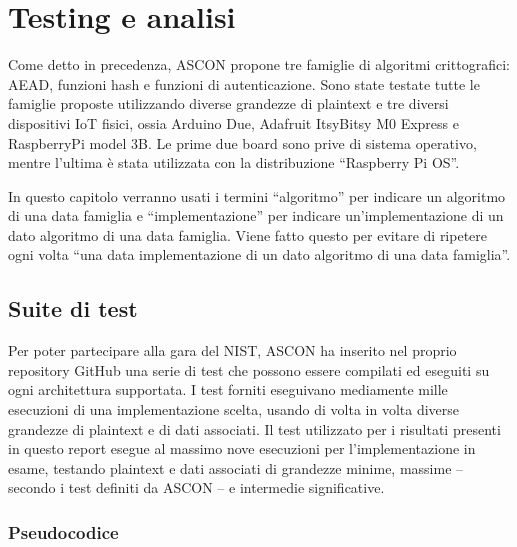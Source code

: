\chapter{Testing e analisi}

Come detto in precedenza, ASCON propone tre famiglie di algoritmi crittografici: AEAD, funzioni hash e funzioni di autenticazione. Sono state testate tutte le famiglie proposte utilizzando diverse grandezze di plaintext e tre diversi dispositivi IoT fisici, ossia Arduino Due, Adafruit ItsyBitsy M0 Express e RaspberryPi model 3B. Le prime due board sono prive di sistema operativo, mentre l'ultima è stata utilizzata con la distribuzione ``Raspberry Pi OS''. \

\noindent In questo capitolo verranno usati i termini ``algoritmo'' per indicare un algoritmo di una data famiglia e ``implementazione'' per indicare un'implementazione di un dato algoritmo di una data famiglia. Viene fatto questo per evitare di ripetere ogni volta ``una data implementazione di un dato algoritmo di una data famiglia''.

\section{Suite di test}

Per poter partecipare alla gara del NIST, ASCON ha inserito nel proprio repository GitHub una serie di test che possono essere compilati ed eseguiti su ogni architettura supportata. I test forniti eseguivano mediamente mille esecuzioni di una implementazione scelta, usando di volta in volta diverse grandezze di plaintext e di dati associati. Il test utilizzato per i risultati presenti in questo report esegue al massimo nove esecuzioni per l'implementazione in esame, testando plaintext e dati associati di grandezze minime, massime – secondo i test definiti da ASCON – e intermedie significative.

\subsection{Pseudocodice}

